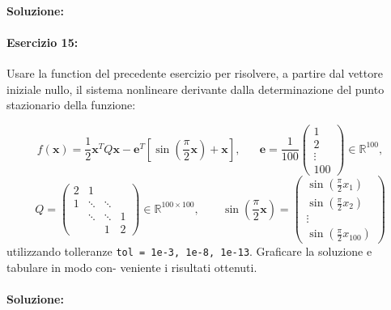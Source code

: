 \documentclass[12pt]{article}
\begin{document}
\paragraph{Soluzione:}

\paragraph{Esercizio 15:} Usare la function del precedente esercizio per risolvere, a partire dal vettore iniziale nullo, 
il sistema nonlineare derivante dalla determinazione del punto stazionario della funzione:

\begin{equation*} 
    f(\boldsymbol{x})=\frac{1}{2}\boldsymbol{x}^TQ\boldsymbol{x}-\boldsymbol{e}^T\left[ \sin(\frac{\pi}{2}\boldsymbol{x})+\boldsymbol{x}\right],\;\;\;\;\;\;
    \boldsymbol{e}=\frac{1}{100}
    \begin{pmatrix}
        1\\
        2\\
        \vdots \\
        100
    \end{pmatrix}
    \in \mathbb{R}^{100},
\end{equation*}
\begin{equation*}
    Q=
    \begin{pmatrix}
        2 & 1 &  & \\
        1 & \ddots &\ddots& \\
        &\ddots &\ddots &1 \\
        & &  1&2
    \end{pmatrix}
    \in \mathbb{R}^{100\times 100}, \;\;\;\;\;\;\;\sin(\frac{\pi}{2}\boldsymbol{x}) =
    \begin{pmatrix}
        \sin(\frac{\pi}{2}x_1)\\
        \sin(\frac{\pi}{2}x_2)\\
        \vdots \\
        \sin(\frac{\pi}{2}x_{100})
    \end{pmatrix}
\end{equation*}
utilizzando tolleranze \texttt{tol = 1e-3, 1e-8, 1e-13}. Graficare la soluzione e tabulare in modo con- veniente i risultati ottenuti.
\paragraph{Soluzione:}
\end{document}
